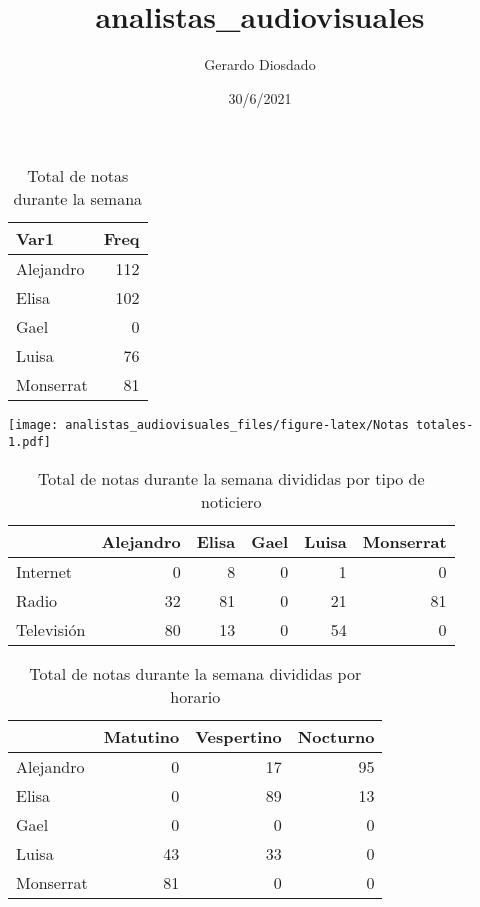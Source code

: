 \documentclass[
]{article}
\title{analistas\_audiovisuales}
\author{Gerardo Diosdado}
\date{30/6/2021}
\begin{document}
\maketitle

\begin{table}

\caption{\label{tab:Notas totales}Total de notas durante la semana}
\centering
\fontsize{10}{12}\selectfont
\begin{tabular}[t]{l|r}
\hline
Var1 & Freq\\
\hline
Alejandro & 112\\
\hline
Elisa & 102\\
\hline
Gael & 0\\
\hline
Luisa & 76\\
\hline
Monserrat & 81\\
\hline
\end{tabular}
\end{table}

\texttt{[image: analistas\_audiovisuales\_files/figure-latex/Notas totales-1.pdf]}

\begin{table}

\caption{\label{tab:Notas por tipo de noticiero}Total de notas durante la semana divididas por tipo de noticiero}
\centering
\fontsize{10}{12}\selectfont
\begin{tabular}[t]{l|r|r|r|r|r}
\hline
  & Alejandro & Elisa & Gael & Luisa & Monserrat\\
\hline
Internet & 0 & 8 & 0 & 1 & 0\\
\hline
Radio & 32 & 81 & 0 & 21 & 81\\
\hline
Televisión & 80 & 13 & 0 & 54 & 0\\
\hline
\end{tabular}
\end{table}
\begin{table}

\caption{\label{tab:Notas por horario}Total de notas durante la semana divididas por horario}
\centering
\fontsize{10}{12}\selectfont
\begin{tabular}[t]{l|r|r|r}
\hline
  & Matutino & Vespertino & Nocturno\\
\hline
Alejandro & 0 & 17 & 95\\
\hline
Elisa & 0 & 89 & 13\\
\hline
Gael & 0 & 0 & 0\\
\hline
Luisa & 43 & 33 & 0\\
\hline
Monserrat & 81 & 0 & 0\\
\hline
\end{tabular}
\end{table}
\end{document}
